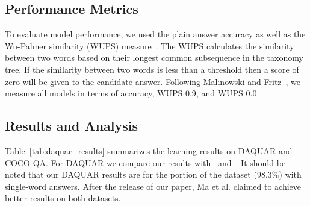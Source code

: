 \documentclass{article} \usepackage{nips15submit_e,times}
\renewcommand{\#}[1]{\textbf{#1}}
\begin{document}
\subsection{Performance Metrics}
To evaluate model performance, we used the plain answer accuracy as well as the
Wu-Palmer similarity (WUPS) measure~\cite{wu94, malinowski14b}. The WUPS
calculates the similarity between two words based on their longest common
subsequence in the taxonomy tree. If the similarity between two words is less
than a threshold then a score of zero will be given to the candidate answer.
Following Malinowski and Fritz~\cite{malinowski14b}, we measure all models
in terms of accuracy, WUPS 0.9, and WUPS 0.0.

\subsection{Results and Analysis}
Table~\ref{tab:daquar_results} summarizes the learning results on DAQUAR
and COCO-QA. For DAQUAR
we compare our results with~\cite{malinowski14b} and~\cite{malinowski15}. It
should be noted that our DAQUAR results are for the portion of the dataset (98.3\%)
with single-word answers. After the release of our paper, Ma et al. \cite{ma15}
claimed to achieve better results on both datasets.
\end{document}
